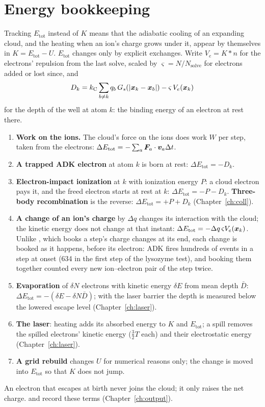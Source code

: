 \section{Energy bookkeeping}
\label{sec:energy}

Tracking $E_{\mathrm{tot}}$ instead of $K$ means that the adiabatic cooling of an expanding cloud, and the heating
when an ion's charge grows under it, appear by themselves in $K = E_{\mathrm{tot}} - U$.
$E_{\mathrm{tot}}$ changes only by explicit exchanges.
Write $V_e = K*n$ for the electrons' repulsion from the last solve, scaled by $\varsigma = N/N_{\mathrm{solve}}$ for
electrons added or lost since, and
\begin{equation}
  D_k = k_{\mathrm C}\sum_{b\ne k} q_b\,G_s(|\bm{x}_k-\bm{x}_b|) - \varsigma\,V_e(\bm{x}_k)
  \label{eq:Dk}
\end{equation}
for the depth of the well at atom $k$: the binding energy of an electron at rest there.
\begin{enumerate}
  \item \textbf{Work on the ions.} The cloud's force on the ions does work $W$ per step, taken from the electrons:
    $\Delta E_{\mathrm{tot}} = -\sum_a\bm{F}_a\cdot\bm{v}_a\Delta t$.
  \item \textbf{A trapped ADK electron} at atom $k$ is born at rest: $\Delta E_{\mathrm{tot}} = -D_k$.
  \item \textbf{Electron-impact ionization} at $k$ with ionization energy $P$: a cloud electron pays it, and
    the freed electron starts at rest at $k$: $\Delta E_{\mathrm{tot}} = -P - D_k$.
    \textbf{Three-body recombination} is the reverse: $\Delta E_{\mathrm{tot}} = +P + D_k$ (Chapter~\ref{ch:coll}).
  \item \textbf{A change of an ion's charge} by $\Delta q$ changes its interaction with the cloud; the kinetic energy does
    not change at that instant: $\Delta E_{\mathrm{tot}} = -\Delta q\,\varsigma V_e(\bm{x}_k)$.
    Unlike , which books a step's charge changes at its end, each change is booked as it happens,
    before its electron: ADK fires hundreds of events in a step at onset (634 in the first step of the lysozyme test),
    and booking them together counted every new ion--electron pair of the step twice.
  \item \textbf{Evaporation} of $\delta N$ electrons with kinetic energy $\delta E$ from mean depth $\bar D$:
    $\Delta E_{\mathrm{tot}} = -(\delta E - \delta N\bar D)$; with the laser barrier the depth is measured below the
    lowered escape level (Chapter~\ref{ch:laser}).
  \item \textbf{The laser}: heating adds its absorbed energy to $K$ and $E_{\mathrm{tot}}$; a spill removes the spilled
    electrons' kinetic energy ($\frac32T$ each) and their electrostatic energy (Chapter~\ref{ch:laser}).
  \item \textbf{A grid rebuild} changes $U$ for numerical reasons only; the change is moved into $E_{\mathrm{tot}}$ so
    that $K$ does not jump.
\end{enumerate}
An electron that escapes at birth never joins the cloud; it only raises the net charge.
 and  record these terms (Chapter~\ref{ch:output}).


